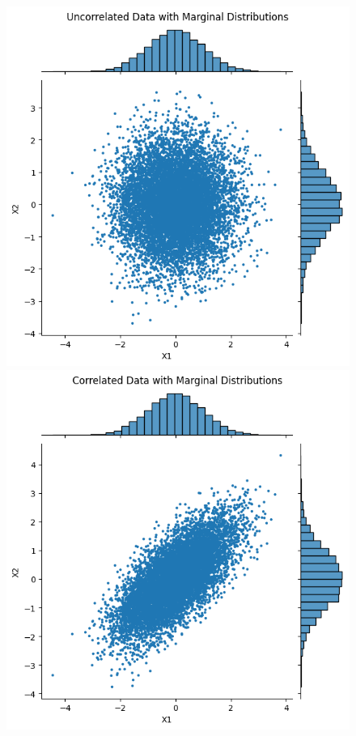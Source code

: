 \begin{figure}
    \label{fig:PITonData}
    \centering
    \begin{minipage}{0.4\textwidth}
        \centering
        \includegraphics[width=\textwidth]{3Theory/pictures/UncorrelatedScatter.png}
        \subcaption{}
    \end{minipage}
    \hfill
    \begin{minipage}{0.4\textwidth}
        \centering
        \includegraphics[width=\textwidth]{3Theory/pictures/CorrelatedScatter.png}

\end{minipage}
\end{figure}
